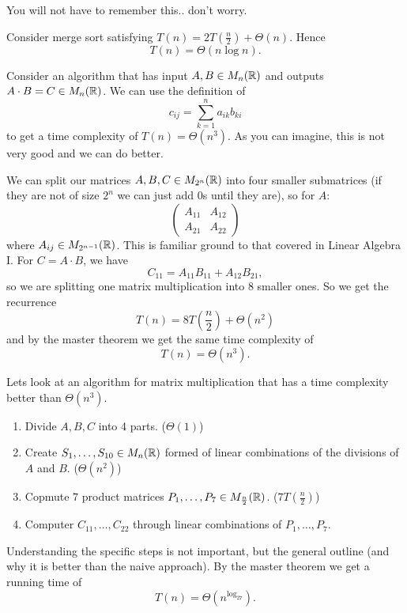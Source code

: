 You will not have to remember this.. don't worry.

\begin{example}
    Consider merge sort satisfying $T(n) = 2T\left(\frac n2\right) + \Theta(n)$. Hence
    \[ T(n) = \Theta(n\log{n}). \]
\end{example}

\begin{example}
    Consider an algorithm that has input $A, B \in M_n(\mathbb{R})$ and outputs $A \cdot B = C \in M_n(\mathbb{R})$. We can use the definition of
    \[ c_{ij} = \sum_{k = 1}^n a_{ik}b_{ki} \]
    to get a time complexity of $T(n) = \Theta(n^3)$. As you can imagine, this is not very good and we can do better.
\end{example}

\begin{example}
    We can split our matrices $A, B, C \in M_{2^n}(\mathbb{R})$ into four smaller submatrices (if they are not of size $2^n$ we can just add $0$s until they are), so for $A$:
    \[
        \begin{pmatrix}
            A_{11} & A_{12} \\
            A_{21} & A_{22}
        \end{pmatrix}
    \]
    where $A_{ij} \in M_{2^{n-1}}(\mathbb{R})$. This is familiar ground to that covered in Linear Algebra I. For $C = A \cdot B$, we have
    \[ C_{11} = A_{11} B_{11} + A_{12} B_{21}, \]
    so we are splitting one matrix multiplication into 8 smaller ones. So we get the recurrence 
    \[ T(n) = 8T\left(\frac n2\right) + \Theta(n^2) \]
    and by the master theorem we get the same time complexity of 
    \[ T(n) = \Theta(n^3). \]
\end{example}

Lets look at an algorithm for matrix multiplication that has a time complexity better than $\Theta(n^3)$.

\begin{example}
    \begin{enumerate}
        \item Divide $A, B, C$ into 4 parts. ($\Theta(1)$)
        \item Create $S_1, \ldots, S_{10} \in M_n(\mathbb{R})$ formed of linear combinations of the divisions of $A$ and $B$. ($\Theta(n^2)$)
        \item Copmute $7$ product matrices $P_1, \ldots, P_7 \in M_{\frac n2}(\mathbb{R})$. ($7T\left(\frac n2\right)$)
        \item Computer $C_{11}, \ldots, C_{22}$ through linear combinations of $P_1, \ldots, P_7$.
    \end{enumerate}
    Understanding the specific steps is not important, 
    but the general outline (and why it is better than the naive approach). 
    By the master theorem we get a running time of 
    \[ T(n) = \Theta\left(n^{\log_27}\right).\] 
\end{example}
